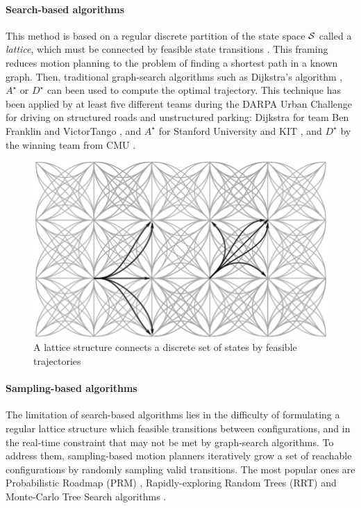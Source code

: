 \paragraph{Search-based algorithms}

This method is based on a regular discrete partition of the state space $\mathcal{S}$ called a \emph{lattice}, which must be connected by feasible state transitions \citep[\eg][]{Pivtoraiko2005}. This framing reduces motion planning to the problem of finding a shortest path in a known graph. Then, traditional graph-search algorithms such as Dijkstra's algorithm \citep{Dijkstra1959}, $A^\star$ \citep{Hart1968} or $D^\star$ \citep{Stentz1994} can been used to compute the optimal trajectory. This technique has been applied by at least five different teams during the DARPA Urban Challenge for driving on structured roads and unstructured parking: Dijkstra for team Ben Franklin \citep{Bohren2008} and VictorTango \citep{Bacha2008}, and $A^\star$ for Stanford University \citep{Montemerlo2008} and KIT \citep{Kammel2008}, and $D^\star$ by the winning team from CMU \citep{Urmson2008}.

\begin{figure}[tp]
	\centering
	\includegraphics[width=0.5\linewidth]{img/lattice2}
	\caption{A lattice structure connects a discrete set of states by feasible trajectories}
\end{figure}

\paragraph{Sampling-based algorithms}

The limitation of search-based algorithms lies in the difficulty of formulating a regular lattice structure which feasible transitions between configurations, and in the real-time constraint that may not be met by graph-search algorithms. To address them, sampling-based motion planners iteratively grow a set of reachable configurations by randomly sampling valid transitions. The most popular ones are Probabilistic Roadmap (PRM) \citep{Kavraki1996}, Rapidly-exploring Random Trees (RRT) \citep{Lavalle98,Karaman2011} and Monte-Carlo Tree Search algorithms \citep[e.g.][]{Kocsis2006}.

